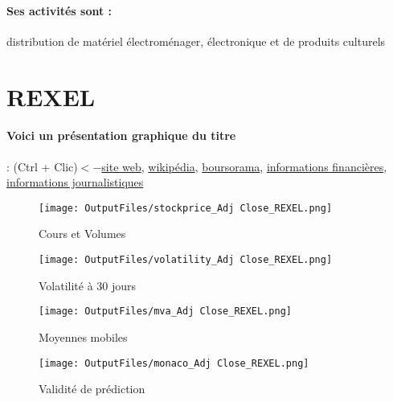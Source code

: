 \documentclass[11pt,a4paper]{report}%
\begin{document}
\paragraph{Ses activités sont : } distribution de matériel électroménager, électronique et de produits culturels 
    
    \newpage

\section{REXEL}

\paragraph{Voici un présentation graphique du titre} : (Ctrl + Clic)$<-$\href{https://www.rexel.com/fr/finance/}{site web}, \href{https://fr.wikipedia.org/wiki/Rexel}{wikipédia}, \href{https://www.boursorama.com/cours/1rPRXL}{boursorama}, \href{https://www.qwant.com/?q=site:https:%2f%2fwww.easybourse.com%2faction-societe%2fREXEL&t=web&client=ext-firefox-hp}{informations financières}, \href{https://bourse.lerevenu.com/cours-de-bourse/fiche-valeur-synthese/REXEL/RXL-FR}{informations journalistiques}
\begin{figure}[!htb]
   \begin{minipage}{0.5\textwidth}
     \centering
     \texttt{[image: OutputFiles/stockprice\_Adj Close\_REXEL.png]}
     \caption{Cours et Volumes}\label{Fig:price_REXEL}
   \end{minipage}\hfill
   \begin{minipage}{0.5\textwidth}
     \centering
     \texttt{[image: OutputFiles/volatility\_Adj Close\_REXEL.png]}
     \caption{Volatilité à 30 jours}\label{Fig:volat_REXEL}
   \end{minipage}
\end{figure}
\begin{figure}[!htb]
   \begin{minipage}{0.5\textwidth}
     \centering
     \texttt{[image: OutputFiles/mva\_Adj Close\_REXEL.png]}
     \caption{Moyennes mobiles}\label{Fig:mva_REXEL}
   \end{minipage}\hfill
   \begin{minipage}{0.5\textwidth}
     \centering
     \texttt{[image: OutputFiles/monaco\_Adj Close\_REXEL.png]}
     \caption{Validité de prédiction}\label{Fig:prediction_REXEL}
   \end{minipage}
\end{figure}
\end{document}

